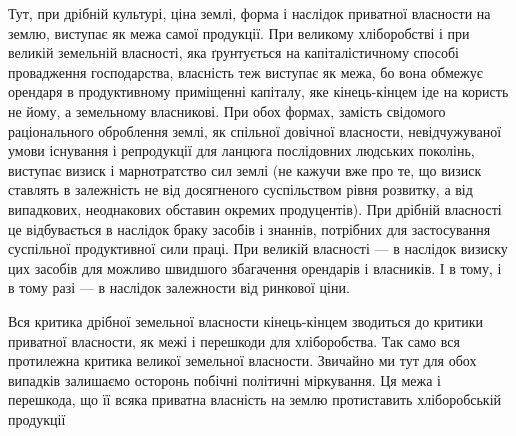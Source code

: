 Тут, при дрібній культурі, ціна землі, форма і наслідок приватної власности
на землю, виступає як межа самої продукції. При великому хліборобстві
і при великій земельній власності, яка ґрунтується на капіталістичному способі
провадження господарства, власність теж виступає як межа, бо вона обмежує
орендаря в продуктивному приміщенні капіталу, яке кінець-кінцем іде на
користь не йому, а земельному власникові. При обох формах, замість свідомого
раціонального оброблення землі, як спільної довічної власности, невідчужуваної
умови існування і репродукції для ланцюга послідовних людських поколінь, виступає
визиск і марнотратство сил землі (не кажучи вже про те, що визиск
ставлять в залежність не від досягненого суспільством рівня розвитку, а від випадкових,
неоднакових обставин окремих продуцентів). При дрібній власності
це відбувається в наслідок браку засобів і знаннів, потрібних для застосування
суспільної продуктивної сили праці. При великій власності — в наслідок визиску
цих засобів для можливо швидшого збагачення орендарів і власників. І в тому,
і в тому разі — в наслідок залежности від ринкової ціни.

Вся критика дрібної земельної власности кінець-кінцем зводиться до критики
приватної власности, як межі і перешкоди для хліборобства. Так само вся
протилежна критика великої земельної власности. Звичайно ми тут для обох
випадків залишаємо осторонь побічні політичні міркування. Ця межа і перешкода,
що її всяка приватна власність на землю протиставить хліборобській продукції
\parbreak{}  %
